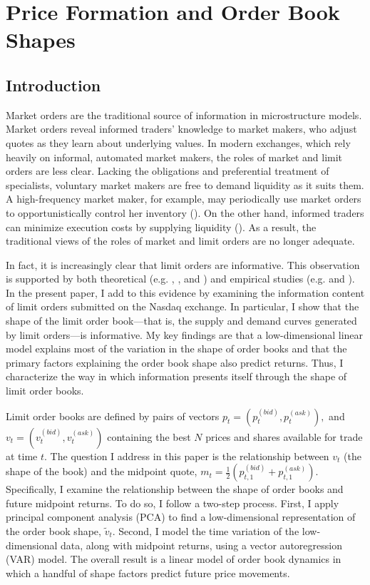 \chapter{Price Formation and Order Book Shapes}
\label{chapter:three}

\section{Introduction}
	Market orders are the traditional source of information in microstructure models. Market orders reveal informed traders' knowledge to market makers, who adjust quotes as they learn about underlying values. In modern exchanges, which rely heavily on informal, automated market makers, the roles of market and limit orders are less clear. Lacking the obligations and preferential treatment of specialists, voluntary market makers are free to demand liquidity as it suits them. A high-frequency market maker, for example, may periodically use market orders to opportunistically control her inventory (\citet{Xu2015}). On the other hand, informed traders can minimize execution costs by supplying liquidity (\citet{Cont2017}). As a result, the traditional views of the roles of market and limit orders are no longer adequate.

	In fact, it is increasingly clear that limit orders are informative. This observation is supported by both theoretical (e.g. \citet{Kaniel2006}, \citet{Goettler2009}, and \cite{Rosu2009}) and empirical studies (e.g. \citet{Cao2009} and \citet{Brogaard2015}). In the present paper, I add to this evidence by examining the information content of limit orders submitted on the Nasdaq exchange. In particular, I show that the shape of the limit order book---that is, the supply and demand curves generated by limit orders---is informative. My key findings are that a low-dimensional linear model explains most of the variation in the shape of order books and that the primary factors explaining the order book shape also predict returns. Thus, I characterize the way in which information presents itself through the shape of limit order books.

	Limit order books are defined by pairs of vectors $p_t = (p_t^{(bid)}, p_t^{(ask)}),$ and $v_t = (v_t^{(bid)}, v_t^{(ask)})$ containing the best $N$ prices and shares available for trade at time $t$. The question I address in this paper is the relationship between $v_t$ (the shape of the book) and the midpoint quote, $m_t = \frac{1}{2} \left( p_{t,1}^{(bid)} + p_{t,1}^{(ask)} \right)$. Specifically, I examine the relationship between the shape of order books and future midpoint returns. To do so, I follow a two-step process. First, I apply principal component analysis (PCA) to find a low-dimensional representation of the order book shape, $\tilde{v}_t$. Second, I model the time variation of the low-dimensional data, along with midpoint returns, using a vector autoregression (VAR) model. The overall result is a linear model of order book dynamics in which a handful of shape factors predict future price movements.

